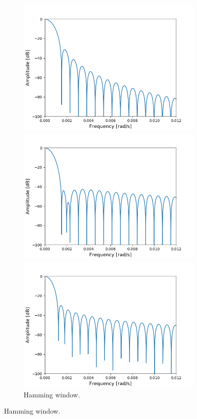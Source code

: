 \begin{figure}[H]
\centering

\begin{subfigure}{0.49\textwidth}
\centering
\includegraphics[width=\textwidth]{figures/dbplots/stft_bilag/8192/hann.png}
\caption{Hann window.}
\includegraphics[width=\textwidth]{figures/dbplots/stft_bilag/8192/hamming.png}
\caption{Hamming window.}
\includegraphics[width=\textwidth]{figures/dbplots/stft_bilag/8192/kaiser4.png}

\end{subfigure}
\end{figure}
